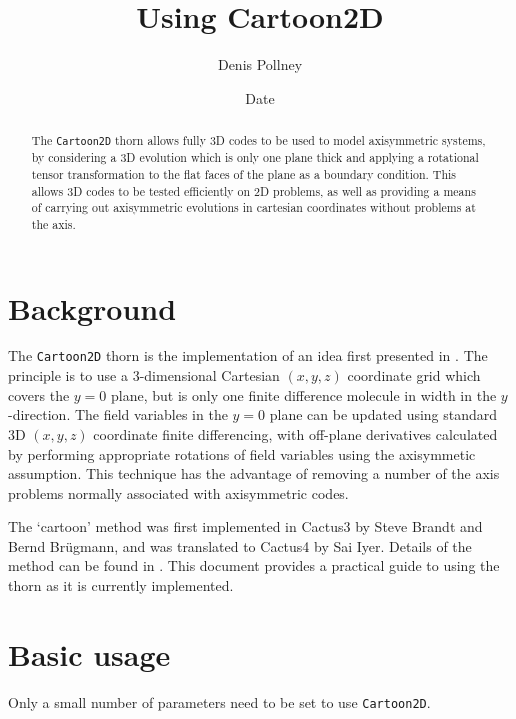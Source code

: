 \documentclass{article}
\begin{document}
\title{Using Cartoon2D}
\author{Denis Pollney}
\date{$ $Date$ $}

\maketitle


\begin{abstract}
  The \texttt{Cartoon2D} thorn allows fully 3D codes to be used
  to model axisymmetric systems, by considering a 3D evolution which
  is only one plane thick and applying a rotational tensor
  transformation to the flat faces of the plane as a boundary
  condition. This allows 3D codes to be tested efficiently on 2D
  problems, as well as providing a means of carrying out axisymmetric
  evolutions in cartesian coordinates without problems at the axis.
\end{abstract}

\section{Background}

The \texttt{Cartoon2D} thorn is the implementation of an idea first
presented in \cite{Alcubierre-etal-2001}. The principle is to use a
3-dimensional Cartesian $(x,y,z)$ coordinate grid which covers the
$y=0$ plane, but is only one finite difference molecule in width in
the $y$-direction. The field variables in the $y=0$ plane can be
updated using standard 3D $(x,y,z)$ coordinate finite differencing,
with off-plane derivatives calculated by performing appropriate
rotations of field variables using the axisymmetic assumption.
This technique has the advantage of removing a number of the axis
problems normally associated with axisymmetric codes.

The `cartoon' method was first implemented in Cactus3 by Steve Brandt
and Bernd Br\"ugmann, and was translated to Cactus4 by Sai
Iyer. Details of the method can be found in
\cite{Alcubierre-etal-2001}. This document provides a practical guide
to using the thorn as it is currently implemented.

\section{Basic usage}

Only a small number of parameters need to be set to use
\texttt{Cartoon2D}.
\end{document}
